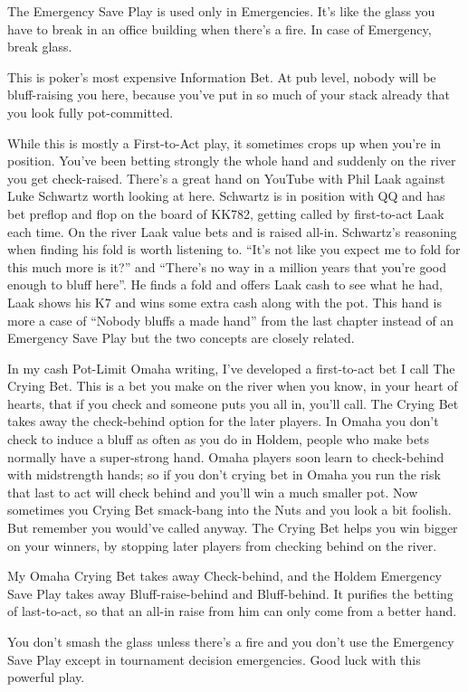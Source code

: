The Emergency Save Play is used only in Emergencies. It's like the
glass you have to break in an office building when there's a fire. In
case of Emergency, break glass.

This is poker's most expensive Information Bet. At pub level, nobody
will be bluff-raising you here, because you've put in so much of your
stack already that you look fully pot-committed.

While this is mostly a First-to-Act play, it sometimes crops up when
you're in position. You've been betting strongly the whole hand and
suddenly on the river you get check-raised. There's a great hand on
YouTube with Phil Laak against Luke Schwartz worth looking at here.
Schwartz is in position with QQ and has bet preflop and flop on the
board of KK782, getting called by first-to-act Laak each time.
On the river Laak value bets and is raised all-in. Schwartz's
reasoning when finding his fold is worth listening to. ``It's not like
you expect me to fold for this much more is it?'' and ``There's no way
in a million years that you're good enough to bluff here''. He finds a
fold and offers Laak cash to see what he had, Laak shows his K7 and
wins some extra cash along with the pot. This hand is more a case of
``Nobody bluffs a made hand'' from the last chapter instead of
an Emergency Save Play but the two concepts are closely related.

In my cash Pot-Limit Omaha writing, I've developed a first-to-act bet
I call The Crying Bet. This is a bet you make on the river when you
know, in your heart of hearts, that if you check and someone puts you
all in, you'll call. The Crying Bet takes away the check-behind option
for the later players. In Omaha you don't check to induce a bluff as
often as you do in Holdem, people who make bets normally have a
super-strong hand. Omaha players soon learn to check-behind with
midstrength hands; so if you don't crying bet in Omaha you run the
risk that last to act will check behind and you'll win a much smaller
pot. Now sometimes you Crying Bet smack-bang into the
Nuts and you look a bit foolish. But remember you would've called
anyway. The Crying Bet helps you win bigger on your winners, by
stopping later players from checking behind on the river.

My Omaha Crying Bet takes away Check-behind, and the Holdem
Emergency Save Play takes away Bluff-raise-behind and Bluff-behind. It
purifies the betting of last-to-act, so that an all-in raise from him
can only come from a better hand.

You don't smash the glass unless there's a fire and you don't use the
Emergency Save Play except in tournament decision emergencies. Good
luck with this powerful play.
